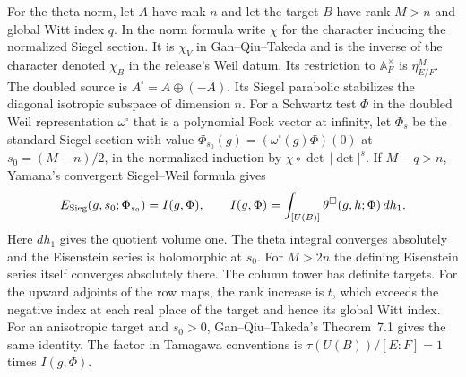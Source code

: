 For the theta norm, let \(A\) have rank \(n\) and let the target \(B\)
have rank \(M>n\) and global Witt index \(q\). In the norm formula
write \(\chi\) for the character inducing the normalized Siegel
section. It is \(\chi_V\) in Gan--Qiu--Takeda and is the inverse of
the character denoted \(\chi_B\) in the release's Weil datum. Its
restriction to \(\mathbb A_F^\times\) is \(\eta_{E/F}^{M}\).
The doubled source is
\(A^\square=A\oplus(-A)\). Its Siegel parabolic stabilizes the
diagonal isotropic subspace of dimension \(n\). For a Schwartz test
\(\Phi\) in the doubled Weil representation \(\omega^\square\) that
is a polynomial Fock vector at infinity, let \(\Phi_s\) be the
standard Siegel section with value
\(\Phi_{s_0}(g)=(\omega^\square(g)\Phi)(0)\) at \(s_0=(M-n)/2\),
in the normalized induction by \(\chi\circ\det\,|\det|^s\).
If \(M-q>n\), Yamana's convergent Siegel--Weil formula gives
\[
 E_{\rm Sieg}(g,s_0;\Phi_{s_0})
 = I(g,\Phi),\qquad
 I(g,\Phi)=\int_{[U(B)]}\theta^\square(g,h;\Phi)\,dh_1 .
\]
Here \(dh_1\) gives the quotient volume one. The theta integral
converges absolutely and the Eisenstein series is holomorphic at
\(s_0\). For \(M>2n\) the defining Eisenstein series itself converges
absolutely there.
\cite[Theorem~2 and the convergence statements preceding it]{tr3yamana}
The column tower has definite targets. For the upward adjoints
of the row maps, the rank increase is \(t\), which exceeds the
negative index at each real place of the target and hence its
global Witt index.
For an anisotropic target and \(s_0>0\), Gan--Qiu--Takeda's
Theorem~7.1 gives the same identity. The factor in Tamagawa
conventions is \(\tau(U(B))/[E:F]=1\) times \(I(g,\Phi)\).
\cite[\S3.1 and Theorem~7.1]{gqt}

